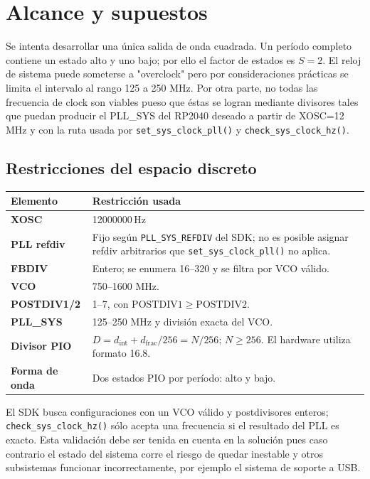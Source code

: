 \documentclass[10pt,a4paper]{article}
\newcommand{\SI}[2]{#1\,\ensuremath{\mathrm{#2}}}
\newcommand{\mega}{M}
\newcommand{\hertz}{Hz}
\begin{document}
\section{Alcance y supuestos}
Se intenta desarrollar una única salida de onda cuadrada. Un período
completo contiene un estado alto y uno bajo; por ello el factor de estados es
\(S=2\). El reloj de sistema puede someterse a "overclock" pero por consideraciones
prácticas se limita el intervalo al rango 125 a 250 MHz.
Por otra parte, no todas las frecuencia de clock son viables pueso que éstas se logran
mediante divisores tales que puedan producir el  PLL\_SYS del RP2040
deseado a partir de XOSC=\SI{12}{\mega\hertz} y con la ruta usada
por \texttt{set\_sys\_clock\_pll()} y \texttt{check\_sys\_clock\_hz()}.

\subsection{Restricciones del espacio discreto}
\begin{tabularx}{\textwidth}{>{\bfseries}p{}Y}
\toprule
{}\color{white}Elemento & \color{white}Restricción usada\\
\midrule
XOSC & \SI{12000000}{\hertz}\\
PLL refdiv & Fijo según \texttt{PLL\_SYS\_REFDIV} del SDK; no es posible asignar
refdiv arbitrarios que \texttt{set\_sys\_clock\_pll()} no aplica.\\
FBDIV & Entero; se enumera 16--320 y se filtra por VCO válido.\\
VCO & 750--1600 MHz.\\
POSTDIV1/2 & 1--7, con \(\mathrm{POSTDIV1}\geq\mathrm{POSTDIV2}\).\\
PLL\_SYS & 125--250 MHz y división exacta del VCO.\\
Divisor PIO & \(D=d_{\mathrm{int}}+d_{\mathrm{frac}}/256=N/256\);
\(N\geq256\). El hardware utiliza formato 16.8.\\
Forma de onda & Dos estados PIO por período: alto y bajo.\\
\bottomrule
\end{tabularx}

El SDK busca configuraciones con un VCO válido y postdivisores enteros;
\texttt{check\_sys\_clock\_hz()} sólo acepta una frecuencia si el resultado
del PLL es exacto. Esta validación debe ser tenida en cuenta en la solución
pues caso contrario el estado del sistema corre el riesgo de quedar inestable
y otros subsistemas funcionar incorrectamente, por ejemplo el sistema de soporte
a USB.
\end{document}
